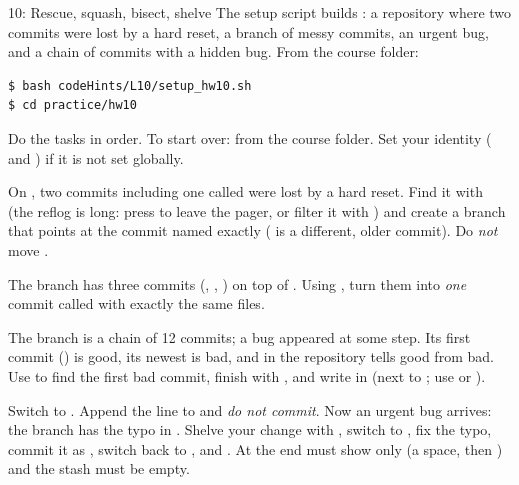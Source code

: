 \begin{homework}{10: Rescue, squash, bisect, shelve}
The setup script builds : a repository where two commits were lost by a hard reset, a branch of messy commits, an urgent bug, and a chain of commits with a hidden bug. From the course folder:
\begin{lstlisting}
$ bash codeHints/L10/setup_hw10.sh
$ cd practice/hw10
\end{lstlisting}
Do the tasks in order. To start over:  from the course folder. Set your identity ( and ) if it is not set globally.

\begin{description}[leftmargin=1.2em,style=nextline]
\item[10.1 Rescue] On , two commits including one called  were lost by a hard reset. Find it with  (the reflog is long: press  to leave the pager, or filter it with ) and create a branch  that points at the commit named exactly  ( is a different, older commit). Do \emph{not} move .
\item[10.2 Squash] The branch  has three commits (, , ) on top of . Using , turn them into \emph{one} commit called  with exactly the same files.
\item[10.3 Bisect] The branch  is a chain of 12 commits; a bug appeared at some step. Its first commit () is good, its newest is bad, and  in the repository tells good from bad. Use  to find the first bad commit, finish with , and write  in  (next to ; use  or ).
\item[10.4 Stash] Switch to . Append the line  to  and \emph{do not commit}. Now an urgent bug arrives: the branch  has the typo  in . Shelve your change with , switch to , fix the typo, commit it as , switch back to , and . At the end  must show only  (a space, then ) and the stash must be empty.

\end{description}
\end{homework}
